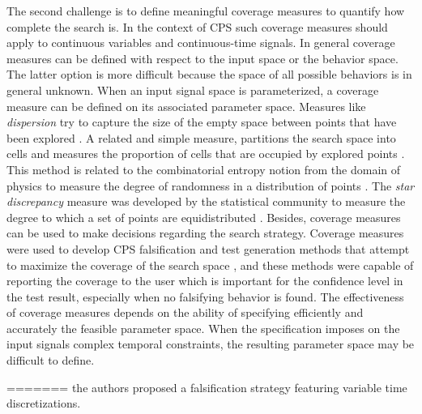 The second challenge is to define meaningful coverage measures to quantify how complete the search is. In the context of CPS such coverage measures should apply to continuous
variables and continuous-time signals. In general coverage measures can be defined with respect to the input space or the behavior space. The latter option is more difficult because the space of all possible behaviors is in general unknown. When an input signal space is parameterized, a coverage measure can be defined on its associated parameter space. Measures like \emph{dispersion} try to capture the size of the empty space between points that have been explored \cite{Esposito04}.
A related and simple measure, partitions the search space into cells and measures the proportion of cells that are occupied by explored points \cite{Skruch2011}. This method is related to the combinatorial entropy notion from the domain of physics to measure the degree of randomness in a distribution of points \cite{Gabbay06}. The \emph{star discrepancy} measure was developed by the statistical community 
to measure the degree to which a set of points are equidistributed \cite{Heinrich03}. Besides, coverage measures can be used to make decisions regarding the search strategy. Coverage measures were used to develop CPS falsification and test generation methods that attempt to maximize the coverage of the search space \cite{DangN09,Dreossi2015,CAV2017}, and these methods were capable of reporting the coverage to the user which is important for the confidence level in the test result, especially when no falsifying behavior is found. The effectiveness of coverage measures depends on the ability of specifying efficiently and accurately the feasible parameter space. When the specification imposes on the input signals complex temporal constraints, the resulting parameter space may be difficult to define. 

=======
\cite{DBLP:conf/atva/DeshmukhJKM15} the authors proposed a
falsification strategy featuring variable time discretizations.

